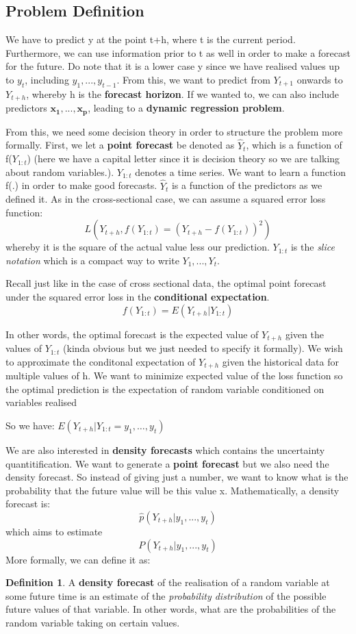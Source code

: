 \documentclass[11pt, oneside]{article}
\theoremstyle{definition}
\newtheorem{definition}{Definition}[section]
\begin{document}
\subsection{Problem Definition}

We have to predict y at the point t+h, where t is the current period. Furthermore, we can use information prior to t as well in order to make a forecast for the future. Do note that it is a lower case y since we have realised values up to $y_t$, including $y_1,...,y_{t-1}$. From this, we want to predict from $Y_{t+1}$ onwards to $Y_{t+h}$, whereby h is the \textbf{forecast horizon}. If we wanted to, we can also include predictors $\bm{x_1},...,\bm{x_p}$, leading to a \textbf{dynamic regression problem}.

From this, we need some decision theory in order to structure the problem more formally. First, we let a \textbf{point forecast} be denoted as $\hat{Y}_t$, which is a function of f($Y_{1:t}$) (here we have a capital letter since it is decision theory so we are talking about random variables.). $Y_{1:t}$ denotes a time series. We want to learn a function f(.) in order to make good forecasts. $\hat{Y}_{t}$ is a function of the predictors as we defined it. As in the cross-sectional case, we can assume a squared error loss function:
$$
L(Y_{t+h}, f(Y_{1:t}) = (Y_{t+h}-f(Y_{1:t}))^2)
$$
whereby it is the square of the actual value less our prediction. $Y_{1:t}$ is the \textit{slice notation} which is a compact way to write $Y_1,...,Y_t$.

Recall just like in the case of cross sectional data, the optimal point forecast under the squared error loss in the \textbf{conditional expectation}.
$$
f(Y_{1:t}) = E(Y_{t+h}|Y_{1:t})
$$

In other words, the optimal forecast is the expected value of $Y_{t+h}$ given the values of $Y_{1:t}$ (kinda obvious but we just needed to specify it formally). We wish to approximate the conditonal expectation of $Y_{t+h}$ given the historical data for multiple values of h. We want to minimize expected value of the loss function so the optimal prediction is the expectation of random variable conditioned on variables realised

So we have: $E(Y_{t+h}|Y_{1:t} = y_1,…,y_t)$


We are also interested in \textbf{density forecasts} which contains the uncertainty quantitification. We want to generate a \textbf{point forecast} but we also need the density forecast. So instead of giving just a number, we want to know what is the probability that the future value will be this value x. Mathematically, a density forecast is:
$$
\hat{p}(Y_{t+h}|y_1,...,y_t)
$$
which aims to estimate
$$
P(Y_{t+h}|y_1,...,y_t)
$$
More formally, we can define it as:
\begin{definition}
  A \textbf{density forecast} of the realisation of a random variable at some future time is an estimate of the \textit{probability distribution} of the possible future values of that variable. In other words, what are the probabilities of the random variable taking on certain values.
\end{definition}
\end{document}
